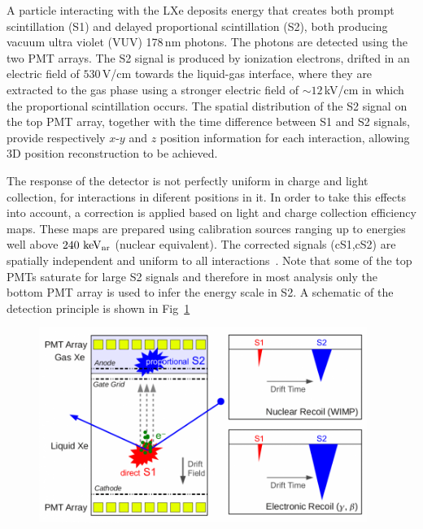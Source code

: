 A particle interacting with the LXe deposits energy that creates both
prompt scintillation (S1) and delayed proportional scintillation (S2), both  producing vacuum ultra violet (VUV) 178\,nm photons. The photons are detected using the two PMT arrays. The S2 signal is produced by ionization electrons, drifted in an electric field of $530$\,V/cm towards the liquid-gas interface, where they are extracted to the gas phase using a stronger electric field of $\sim12$\,kV/cm in which the proportional scintillation occurs. 
The spatial distribution of the S2 signal on the top PMT array, together with the time difference between S1 and S2 signals, provide respectively $x$-$y$ and $z$ position information for each interaction, allowing 3D position reconstruction to be achieved.

The response of the detector is not perfectly uniform in charge and light collection, for interactions in diferent positions in it. In order to take this effects into account, a correction is applied based on light and charge collection efficiency maps. These maps are prepared using calibration sources ranging up to energies well above $240~\mathrm{keV_\mathrm{nr}}$ (nuclear equivalent). The corrected signals (cS1,cS2) are spatially independent and uniform to all interactions~\cite{xe100_instr2012}. Note that some of the top PMTs saturate for large S2 signals and therefore in most analysis only the bottom PMT array is used to infer the energy scale in S2. A schematic of the detection principle is shown in Fig~\ref{fig:xe100TPC}

\begin{figure}[]
	\centering
	\includegraphics[width=0.95\textwidth]{figs/xe100TPC.png}
	\label{fig:xe100TPC}
\end{figure}

